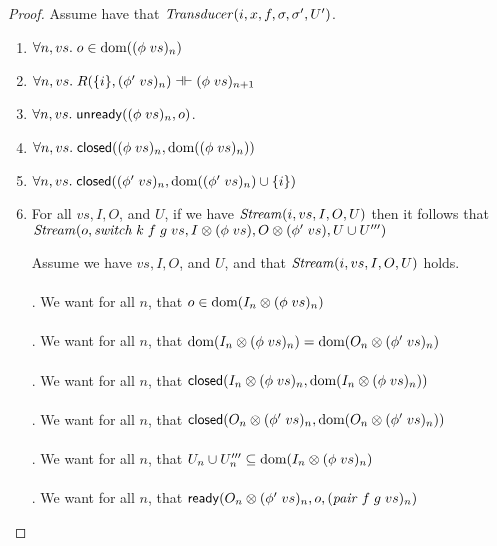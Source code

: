 \begin{proof}
Assume have that $\mathit{Transducer}(i, x, f, \sigma, \sigma', U')$. 
\begin{enumerate}
\item $\forall n, vs.\; o \in \mbox{dom}({(\phi\;vs)_n})$ 


\item $\forall n, vs.\; R(\{{i}\}, (\phi'\;vs)_n) \dashv\vdash (\phi\;vs)_{n+1}$


\item $\forall n, vs.\; \mathsf{unready}({(\phi\;vs)_n}, {o})$.

\item $\forall n, vs.\; \mathsf{closed}({(\phi\;vs)_n}, {\mbox{dom}({(\phi\;vs)_n})})$


\item $\forall n, vs.\; \mathsf{closed}({(\phi'\;vs)_n}, {\mbox{dom}({(\phi'\;vs)_n}) \cup \{{i}\}})$ 

\item For all $vs, I, O$, and $U$, if we have $\mathit{Stream}(i, vs, I, O, U)$ then it follows that $\mathit{Stream}(o, \mathit{switch}\;k\;f\;g\;vs, I \otimes (\phi\;vs), O \otimes (\phi'\;vs), U \cup U''')$
  \begin{tabbedproof}
  Assume we have $vs, I, O$, and $U$, and that $\mathit{Stream}(i, vs, I, O, U)$ holds. \\

  \\ . We want for all $n$, that $o \in \mbox{dom}({I_n \otimes (\phi\;vs)_n})$ \\

  \\ . We want for all $n$, that $\mbox{dom}({I_n \otimes (\phi\;vs)_n}) = \mbox{dom}({O_n \otimes (\phi'\;vs)_n})$ \\

  \\ . We want for all $n$, that $\mathsf{closed}({I_n \otimes (\phi\;vs)_n}, {\mbox{dom}({I_n \otimes (\phi\;vs)_n})})$\\

  \\ . We want for all $n$, that $\mathsf{closed}({O_n \otimes (\phi'\;vs)_n}, {\mbox{dom}({O_n \otimes (\phi'\;vs)_n})})$\\

  \\ . We want for all $n$, that $U_n \cup U'''_n \subseteq \mbox{dom}({I_n \otimes (\phi\;vs)_n})$ \\

  \\ . We want for all $n$, that $\mathsf{ready}({O_n \otimes (\phi'\;vs)_n}, {o}, {(\mathit{pair}\;f\;g\;vs)_n})$ \\


\end{tabbedproof}
\end{enumerate}
\end{proof}
